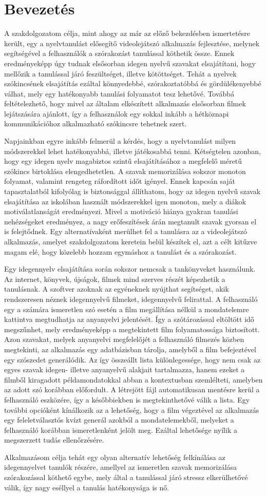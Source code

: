 \chapter*{Bevezetés}
\onehalfspace
A szakdolgozatom célja, mint ahogy az már az előző bekezdésben ismertetésre került, egy a nyelvtanulást elősegítő videolejátszó alkalmazás fejlesztése, melynek segítségével a felhasználók a szórakozást tanulással köthetik össze. Ennek eredményeképp úgy tudnak elsősorban idegen nyelvű szavakat elsajátítani, hogy mellőzik a tanulással járó feszültséget, illetve kötöttséget. Tehát a nyelvek szókincsének elsajátítás ezáltal könnyedebbé, szórakoztatóbbá és gördülékenyebbé válhat, mely egy hatékonyabb tanulási folyamatot tesz lehetővé. Továbbá feltételezhető, hogy mivel az általam elkészített alkalmazás elsősorban filmek lejátszására ajánlott, így a felhasználok egy sokkal inkább a hétköznapi kommunikációhoz alkalmazható szókincsre tehetnek szert.

Napjainkban egyre inkább felmerül a kérdés, hogy a nyelvtanulást milyen módszerekkel lehet hatékonyabbá, illetve játékosabbá tenni. Kétségtelen azonban, hogy egy idegen nyelv magabiztos szintű elsajátításához a megfelelő méretű szókincs birtoklása elengedhetetlen. A szavak memorizálása sokszor monoton folyamat, valamint rengeteg ráfordított időt igényel. Ennek kapcsán saját tapasztalatból kifolyólag is biztonsággal állíthatom, hogy az idegen nyelvű szavak elsajátítása az iskolában használt módszerekkel igen monoton, mely a diákok motiválatlanságát eredményezi. Mivel a motiváció hiánya gyakran tanulási nehézségeket eredményez, a nagy erőfeszítések árán megtanult szavak gyorsan el is felejtődnek. Egy alternatívaként merülhet fel a tanulásra az a videolejátszó alkalmazás, amelyet szakdolgozatom keretein belül készítek el, azt a célt kitűzve magam elé, hogy közelebb hozzam egymáshoz a tanulást és a szórakozást.

Egy idegennyelv elsajátítása során sokszor nemcsak a tankönyveket használunk. Az internet, könyvek, újságok, filmek mind szerves részét képezhetik a tanulásnak. A szoftver azoknak az egyéneknek nyújthat segítséget, akik rendszeresen néznek idegennyelvű filmeket, idegennyelvű felirattal. A felhasználó egy a számára ismeretlen szó esetén a film megállítása nélkül a mondatelemre kattintva megtudhatja az anyanyelvi jelentését. Így a szótározással eltöltött idő megszűnhet, mely eredményeképp a megtekintett film folyamatossága biztosított. Azon szavakat, melyek anyanyelvi megfelelőjét a felhasználó filmezés közben megtekinti, az alkalmazás egy adatbázisban tárolja, amelyből a film befejeztével egy szószedet generálódik. Az így összeállt lista különlegessége, hogy nem csak az egyes szavak idegen- illetve anyanyelvű alakjait tartalmazza, hanem ezeket a filmből kiragadott példamondatokkal abban a kontextusban szemlélteti, amelyben az adott szó korábban előfordult. A létrejött fájl automatikusan mentésre kerül a felhasználó eszközére, így a későbbiekben is megtekinthetővé válik a lista. Egy további opcióként kínálkozik az a lehetőség, hogy a film végeztével az alkalmazás egy feleletválasztós kvízt generál azokból a mondatelemekből, melyeket a felhasználó korábban ismeretlenként jelölt meg. Ezáltal lehetősége nyílik a megszerzett tudás ellenőrzésére.

Alkalmazásom célja tehát egy olyan alternatív lehetőség felkínálása az idegennyelvet tanulók részére, amellyel az ismeretlen szavak memorizálása szórakozással köthető egybe, mely által a tanulással járó stressz elkerülhetővé válik, így nagy eséllyel a tanulás hatékonysága is nő.
